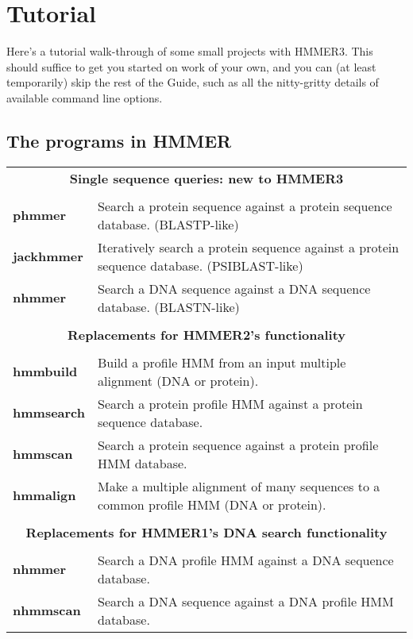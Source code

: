 
\section{Tutorial}
\label{section:tutorial}
\setcounter{footnote}{0}

Here's a tutorial walk-through of some small projects with
HMMER3. This should suffice to get you started on work of your own,
and you can (at least temporarily) skip the rest of the Guide,
such as all the nitty-gritty details of available command line
options.

\subsection {The programs in HMMER}

\begin{tabular}{ll}
\multicolumn{2}{c}{\textbf{Single sequence queries: new to HMMER3}} \\ 
 & \\ 
\textbf{phmmer}    & Search a protein sequence against a protein sequence database. (BLASTP-like) \\ 
\textbf{jackhmmer} & Iteratively search a protein sequence against a protein sequence database. (PSIBLAST-like) \\ 
\textbf{nhmmer}    & Search a DNA sequence against a DNA sequence database. (BLASTN-like) \\ 
& \\
\multicolumn{2}{c}{\textbf{Replacements for HMMER2's functionality}}  \\
 & \\ 
\textbf{hmmbuild}  & Build a profile HMM from an input multiple alignment (DNA or protein).\\  
\textbf{hmmsearch} & Search a protein profile HMM against a protein sequence database.\\ 
\textbf{hmmscan}   & Search a protein sequence against a protein profile HMM database.\\ 
\textbf{hmmalign}  & Make a multiple alignment of many sequences to a common profile HMM (DNA or protein).\\ 
& \\ 
\multicolumn{2}{c}{\textbf{Replacements for HMMER1's DNA search functionality}} \\ 
& \\ 
\textbf{nhmmer}    & Search a DNA profile HMM against a DNA sequence database.\\
\textbf{nhmmscan}  & Search a DNA sequence against a DNA profile HMM database.\\

\end{tabular}
